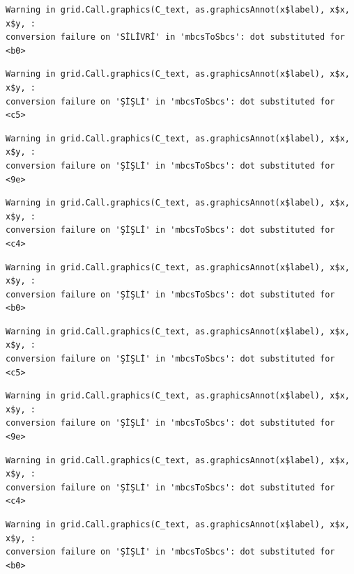 \documentclass[
  11pt,
  a4paper,
  DIV=11,
  numbers=noendperiod]{scrartcl}
\begin{document}
\begin{verbatim}
Warning in grid.Call.graphics(C_text, as.graphicsAnnot(x$label), x$x, x$y, :
conversion failure on 'SİLİVRİ' in 'mbcsToSbcs': dot substituted for <b0>
\end{verbatim}

\begin{verbatim}
Warning in grid.Call.graphics(C_text, as.graphicsAnnot(x$label), x$x, x$y, :
conversion failure on 'ŞİŞLİ' in 'mbcsToSbcs': dot substituted for <c5>
\end{verbatim}

\begin{verbatim}
Warning in grid.Call.graphics(C_text, as.graphicsAnnot(x$label), x$x, x$y, :
conversion failure on 'ŞİŞLİ' in 'mbcsToSbcs': dot substituted for <9e>
\end{verbatim}

\begin{verbatim}
Warning in grid.Call.graphics(C_text, as.graphicsAnnot(x$label), x$x, x$y, :
conversion failure on 'ŞİŞLİ' in 'mbcsToSbcs': dot substituted for <c4>
\end{verbatim}

\begin{verbatim}
Warning in grid.Call.graphics(C_text, as.graphicsAnnot(x$label), x$x, x$y, :
conversion failure on 'ŞİŞLİ' in 'mbcsToSbcs': dot substituted for <b0>
\end{verbatim}

\begin{verbatim}
Warning in grid.Call.graphics(C_text, as.graphicsAnnot(x$label), x$x, x$y, :
conversion failure on 'ŞİŞLİ' in 'mbcsToSbcs': dot substituted for <c5>
\end{verbatim}

\begin{verbatim}
Warning in grid.Call.graphics(C_text, as.graphicsAnnot(x$label), x$x, x$y, :
conversion failure on 'ŞİŞLİ' in 'mbcsToSbcs': dot substituted for <9e>
\end{verbatim}

\begin{verbatim}
Warning in grid.Call.graphics(C_text, as.graphicsAnnot(x$label), x$x, x$y, :
conversion failure on 'ŞİŞLİ' in 'mbcsToSbcs': dot substituted for <c4>
\end{verbatim}

\begin{verbatim}
Warning in grid.Call.graphics(C_text, as.graphicsAnnot(x$label), x$x, x$y, :
conversion failure on 'ŞİŞLİ' in 'mbcsToSbcs': dot substituted for <b0>
\end{verbatim}
\end{document}
